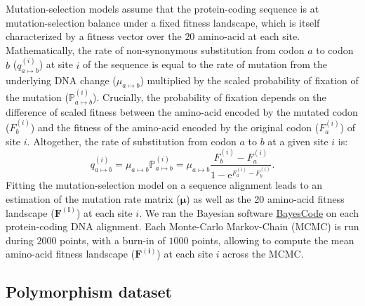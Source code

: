 \documentclass{article}
\newcommand{\UniDimArray}[1]{\bm{#1}}
\newcommand{\e}{\mathrm{e}}
\newcommand{\proba}{\mathbb{P}}
\begin{document}
    Mutation-selection models assume that the protein-coding sequence is at mutation-selection balance under a fixed fitness landscape, which is itself characterized by a fitness vector over the $20$ amino-acid at each site\cite{yang_mutationselection_2008, halpern_evolutionary_1998, rodrigue_mechanistic_2010}.
    Mathematically, the rate of non-synonymous substitution from codon $a$ to codon $b$ ($q_{a \mapsto b}^{(i)}$) at site $i$ of the sequence is equal to the rate of mutation from the underlying DNA change ($\mu_{a \mapsto b}$) multiplied by the scaled probability of fixation of the mutation ($\proba_{a \mapsto b}^{(i)}$).
    Crucially, the probability of fixation depends on the difference of scaled fitness between the amino-acid encoded by the mutated codon ($F_b^{(i)}$) and the fitness of the amino-acid encoded by the original codon ($F_a^{(i)}$) of site $i$\cite{wright_evolution_1931, fisher_genetical_1930}.
    Altogether, the rate of substitution from codon $a$ to $b$ at a given site $i$ is:
    \begin{equation}
        q_{a \mapsto b}^{(i)} = \mu_{a \mapsto b} \proba_{a \mapsto b}^{(i)} = \mu_{a \mapsto b} \dfrac{F_b^{(i)} - F_a^{(i)}}{1 - \e^{F_a^{(i)} - F_b^{(i)}}}.\label{eq:equation}
    \end{equation}
    Fitting the mutation-selection model on a sequence alignment leads to an estimation of the mutation rate matrix ($\UniDimArray{\mu}$) as well as the 20 amino-acid fitness landscape ($\UniDimArray{F^{(i)}}$) at each site $i$.
    We ran the Bayesian software \href{https://github.com/bayesiancook/bayescode}{BayesCode} on each protein-coding DNA alignment\cite{lartillot_phylobayes_2013, rodrigue_detecting_2017}.
    Each Monte-Carlo Markov-Chain (MCMC) is run during $2000$ points, with a burn-in of $1000$ points, allowing to compute the mean amino-acid fitness landscape ($\UniDimArray{F^{(i)}}$) at each site $i$ across the MCMC\@.

    \subsection{Polymorphism dataset}
    \label{subsec:polymorphism-dataset}
\end{document}
